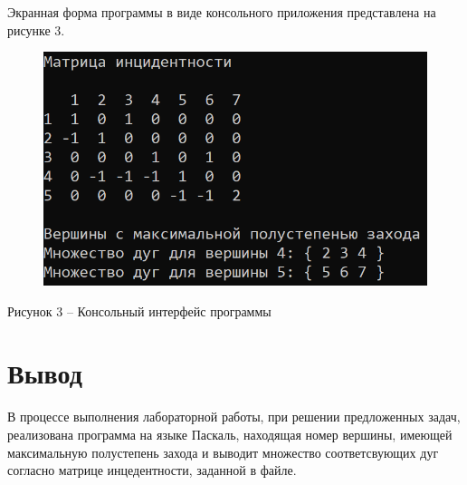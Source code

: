 \documentclass[a4paper,14pt]{extarticle}
\begin{document}
  Экранная форма программы в виде консольного приложения представлена на рисунке 3.

  \begin{figure}[h]
    \centering
    \includegraphics[width=0.6\linewidth]{images/image.png}
  \end{figure}
  \begin{center}
    Рисунок 3 – Консольный интерфейс программы
  \end{center}

  \section*{\hspace{12.5mm}Вывод}
  В процессе выполнения лабораторной работы, при решении предложенных задач, реализована программа на языке Паскаль, находящая номер вершины, имеющей максимальную полустепень захода и выводит множество соответсвующих дуг согласно матрице инцедентности, заданной в файле.
\end{document}
